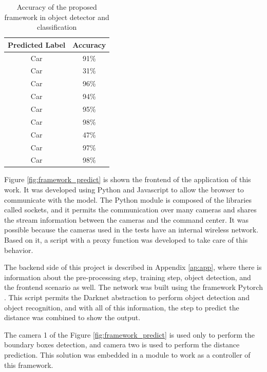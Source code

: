 \begin{table}[H]
\centering
\caption{Accuracy of the proposed framework in object detector and classification}
\begin{tabular}{c|c}
\hline
Predicted Label & Accuracy \\ \hline
Car             & 91\%     \\ \hline
Car             & 31\%     \\ \hline
Car             & 96\%     \\ \hline
Car             & 94\%     \\ \hline
Car             & 95\%     \\ \hline
Car             & 98\%     \\ \hline
Car             & 47\%     \\ \hline
Car             & 97\%     \\ \hline
Car             & 98\%     \\ \hline
\end{tabular}
\label{tab:accuracy}
\end{table}



Figure \ref{fig:framework_predict} is shown the frontend of the application of this work. It was developed using Python and Javascript to allow the browser to communicate with the model. The Python module is composed of the libraries called sockets, and it permits the communication over many cameras and shares the stream information between the cameras and the command center. It was possible because the cameras used in the tests have an internal wireless network. Based on it, a script with a proxy function was developed to take care of this behavior. 

The backend side of this project is described in Appendix \ref{ap:app}, where there is information about the pre-processing step, training step, object detection, and the frontend scenario as well. The network was built using the framework Pytorch \cite{paszke2019pytorch}. This script permits the Darknet abstraction to perform object detection and object recognition, and with all of this information, the step to predict the distance was combined to show the output. 

The camera 1 of the Figure \ref{fig:framework_predict} is used only to perform the boundary boxes detection, and camera two is used to perform the distance prediction. This solution was embedded in a module to work as a controller of this framework.

